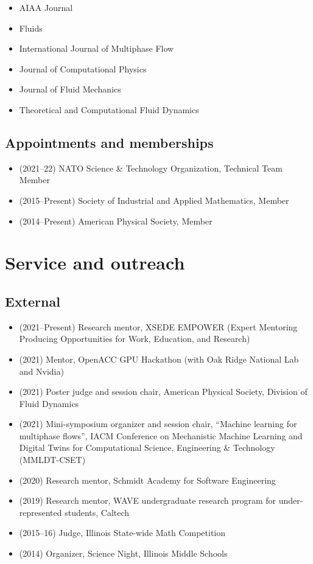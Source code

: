 \begin{itemize}
    \item AIAA Journal
    \item Fluids
    \item International Journal of Multiphase Flow
    \item Journal of Computational Physics
    \item Journal of Fluid Mechanics
    \item Theoretical and Computational Fluid Dynamics
\end{itemize}

\subsection{Appointments and memberships}

\begin{itemize}
    \item (2021--22) NATO Science \& Technology Organization, Technical Team Member
    \item (2015--Present) Society of Industrial and Applied Mathematics, Member
    \item (2014--Present) American Physical Society, Member
\end{itemize}

\section{Service and outreach}

\subsection{External}
\begin{itemize}
    \item (2021--Present) Research mentor, XSEDE EMPOWER (Expert Mentoring Producing Opportunities for Work, Education, and Research)
    \item (2021) Mentor, OpenACC GPU Hackathon (with Oak Ridge National Lab and Nvidia)
    \item (2021) Poster judge and session chair, American Physical Society, Division of Fluid Dynamics
    \item (2021) Mini-symposium organizer and session chair, ``Machine learning for multiphase flows'', IACM Conference on Mechanistic Machine Learning and Digital Twins for Computational Science, Engineering \& Technology (MMLDT-CSET)
    \item (2020) Research mentor, Schmidt Academy for Software Engineering
    \item (2019) Research mentor, WAVE undergraduate research program for under-represented students, Caltech
    \item (2015--16) Judge, Illinois State-wide Math Competition
    \item (2014) Organizer, Science Night, Illinois Middle Schools
\end{itemize}

